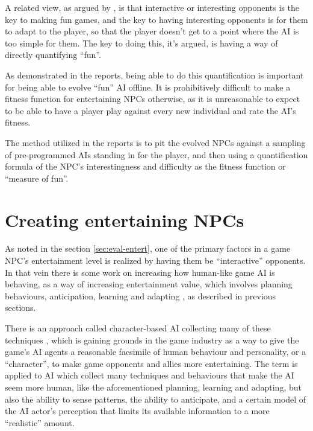 A related view, as argued by
\citet{yannakakis2004interactive,yannakakis2004evolving}, is that interactive or
interesting opponents is the key to making fun games, and the key to having
interesting opponents is for them to adapt to the player, so that the player
doesn't get to a point where the AI is too simple for them. The key to doing
this, it's argued, is having a way of directly quantifying ``fun''.

As demonstrated in the reports, being able to do this quantification is
important for being able to evolve ``fun'' AI offline. It is prohibitively
difficult to make a fitness function for entertaining NPCs otherwise, as it is
unreasonable to expect to be able to have a player play against every new
individual and rate the AI's fitness.

The method utilized in the reports is to pit the evolved NPCs against a sampling
of pre-programmed AIs standing in for the player, and then using a
quantification formula of the NPC's interestingness and difficulty as the
fitness function or ``measure of fun''.

\section{Creating entertaining NPCs}
\label{sec:making-entert-npc}

As noted in the section \ref{sec:eval-entert}, one of the primary factors in a game NPC's
entertainment level is realized by having them be ``interactive'' opponents.
In that vein there is some work on increasing how human-like game AI is
behaving, as a way of increasing entertainment value, which involves planning
behaviours, anticipation, learning and adapting
\citep{orkin2004symbolic,orkin2003applying,
  yannakakis2009real,spronck2005adaptive}, as described in previous sections.

There is an approach called character-based AI collecting many of these
techniques \citep{isla2002new}, which is gaining grounds in the game industry as
a way to give the game's AI agents a reasonable facsimile of human behaviour and
personality, or a ``character'', to make game opponents and allies more
entertaining. The term is applied to AI which collect many techniques and
behaviours that make the AI seem more human, like the aforementioned planning,
learning and adapting, but also the ability to sense patterns, the ability to
anticipate, and a certain model of the AI actor's perception that limits its
available information to a more ``realistic'' amount.


